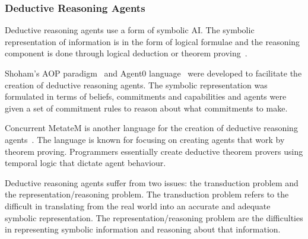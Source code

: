 \documentclass[]{final_report}
\begin{document}
\subsubsection{Deductive Reasoning Agents}
Deductive reasoning agents use a form of symbolic AI. The symbolic representation of information is in the form of logical formulae and the reasoning component is done through logical deduction or theorem proving~\cite{wooldridge2009introduction}.\par 
Shoham's AOP paradigm~\cite{shoham1993agent} and Agent0 language~\cite{shoham1991agent0} were developed to facilitate the creation of deductive reasoning agents. The symbolic representation was formulated in terms of beliefs, commitments and capabilities and agents were given a set of commitment rules to reason about what commitments to make.\par 
Concurrent MetateM is another language for the creation of deductive reasoning agents~\cite{fisher1993concurrent}.  The language is known for focusing on creating agents that work by theorem proving. Programmers essentially create deductive theorem provers using temporal logic that dictate agent behaviour.\par 
Deductive reasoning agents suffer from two issues: the transduction problem and the representation/reasoning problem. The transduction problem refers to the difficult in translating from the real world into an accurate and adequate symbolic representation. The representation/reasoning problem are the difficulties in representing symbolic information and reasoning about that information.
\end{document}
